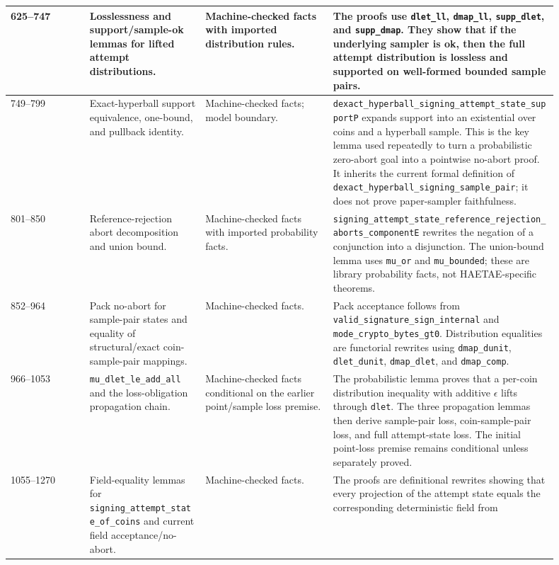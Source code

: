 \documentclass[11pt]{report}
\DeclareRobustCommand{\ec}[1]{\ifmmode\text{\nolinkurl{#1}}\else\nolinkurl{#1}\fi}
\theoremstyle{definition}
\theoremstyle{plain}
\begin{document}
\begin{longtable}{p{0.13\linewidth}p{0.19\linewidth}p{0.21\linewidth}p{0.37\linewidth}}
\midrule
625--747 &
Losslessness and support/sample-ok lemmas for lifted attempt distributions. &
Machine-checked facts with imported distribution rules. &
The proofs use \ec{dlet\_ll}, \ec{dmap\_ll}, \ec{supp\_dlet}, and
\ec{supp\_dmap}.  They show that if the underlying sampler is ok, then the
full attempt distribution is lossless and supported on well-formed bounded
sample pairs. \\
\midrule
749--799 &
Exact-hyperball support equivalence, one-bound, and pullback identity. &
Machine-checked facts; model boundary. &
\ec{dexact\_hyperball\_signing\_attempt\_state\_supportP} expands support
into an existential over coins and a hyperball sample.  This is the key lemma
used repeatedly to turn a probabilistic zero-abort goal into a pointwise
no-abort proof.  It inherits the current formal definition of
\ec{dexact\_hyperball\_signing\_sample\_pair}; it does not prove paper-sampler
faithfulness. \\
\midrule
801--850 &
Reference-rejection abort decomposition and union bound. &
Machine-checked facts with imported probability facts. &
\ec{signing\_attempt\_state\_reference\_rejection\_aborts\_componentE}
rewrites the negation of a conjunction into a disjunction.  The union-bound
lemma uses \ec{mu\_or} and \ec{mu\_bounded}; these are library probability
facts, not HAETAE-specific theorems. \\
\midrule
852--964 &
Pack no-abort for sample-pair states and equality of structural/exact
coin-sample-pair mappings. &
Machine-checked facts. &
Pack acceptance follows from \ec{valid\_signature\_sign\_internal} and
\ec{mode\_crypto\_bytes\_gt0}.  Distribution equalities are functorial
rewrites using \ec{dmap\_dunit}, \ec{dlet\_dunit}, \ec{dmap\_dlet}, and
\ec{dmap\_comp}. \\
\midrule
966--1053 &
\ec{mu\_dlet\_le\_add\_all} and the loss-obligation propagation chain. &
Machine-checked facts conditional on the earlier point/sample loss premise. &
The probabilistic lemma proves that a per-coin distribution inequality with
additive \(\epsilon\) lifts through \ec{dlet}.  The three propagation lemmas
then derive sample-pair loss, coin-sample-pair loss, and full attempt-state
loss.  The initial point-loss premise remains conditional unless separately
proved. \\
\midrule
1055--1270 &
Field-equality lemmas for \ec{signing\_attempt\_state\_of\_coins} and current
field acceptance/no-abort. &
Machine-checked facts. &
The proofs are definitional rewrites showing that every projection of the
attempt state equals the corresponding deterministic field from

\end{longtable}
\end{document}
